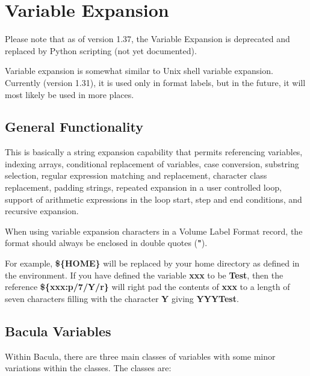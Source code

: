 
\chapter{Variable Expansion}
\label{VarsChapter}


Please note that as of version 1.37, the Variable Expansion
is deprecated and replaced by Python scripting (not yet
documented).

Variable expansion is somewhat similar to Unix shell variable expansion.
Currently (version 1.31), it is used only in format labels, but in the future,
it will most likely be used in more places.

\section{General Functionality}

This is basically a string expansion capability that permits referencing
variables, indexing arrays, conditional replacement of variables, case
conversion, substring selection, regular expression matching and replacement,
character class replacement, padding strings, repeated expansion in a user
controlled loop, support of arithmetic expressions in the loop start, step and
end conditions, and recursive expansion.

When using variable expansion characters in a Volume Label Format record, the
format should always be enclosed in double quotes ({\bf "}).

For example, {\bf \$\{HOME\}} will be replaced by your home directory as
defined in the environment. If you have defined the variable {\bf xxx} to be
{\bf Test}, then the reference {\bf \$\{xxx:p/7/Y/r\}} will right pad the
contents of {\bf xxx} to a length of seven characters filling with the
character {\bf Y} giving {\bf YYYTest}.

\section{Bacula Variables}

Within Bacula, there are three main classes of variables with some minor
variations within the classes. The classes are:

